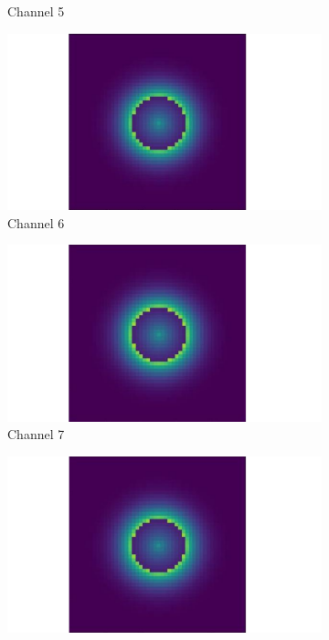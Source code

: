 \begin{figure}[htbp]
\begin{minipage}{0.87\textwidth}
\begin{subfigure}{0.23\textwidth}
            \caption{Channel 5}
        \end{subfigure}
        \begin{subfigure}{0.23\textwidth}
            \includegraphics[width=\textwidth]{figures/raw_data/21/channel_6.pdf}
            \caption{Channel 6}
        \end{subfigure}
        \begin{subfigure}{0.23\textwidth}
            \includegraphics[width=\textwidth]{figures/raw_data/21/channel_7.pdf}
            \caption{Channel 7}
        \end{subfigure}
        \begin{subfigure}{0.23\textwidth}
            \includegraphics[width=\textwidth]{figures/raw_data/21/channel_8.pdf}

\end{subfigure}
\end{minipage}
\end{figure}

